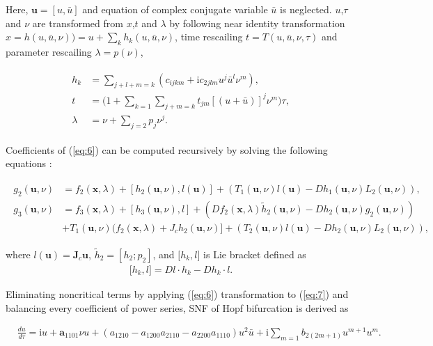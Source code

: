 \documentclass[openacc]{rsproca_new}%
\def\vec#1{\ensuremath{\mathbf{#1}}}
\newcommand{\Eref}[1]{(\ref{#1})}
\begin{document}
\noindent Here, \(\vec{u}=[u,\bar{u}]\) and equation of complex conjugate variable \(\bar{u}\) is neglected. \(u\),\(\tau\) and \(\nu\) are transformed from \(x\),\(t\) and \(\lambda\) by following near identity transformation
\(x=h(u,\bar{u},\nu))=u+\sum_k h_k(u,\bar{u},\nu)\), time rescailing \(t=T(u,\bar{u},\nu,\tau)\) and parameter rescailing \(\lambda=p(\nu)\),

\begin{align}\label{eq:6}
\begin{split}
h_k &=\sum_{j+l+m=k}(c_{ijkm}+\textrm{i}c_{2jlm}u^j\bar{u}^l \nu^m),\\
t &=\Big(1+\sum_{k=1}\sum_{j+m=k}t_{jm}[(u+\bar{u})]^j\nu^m\Big)\tau,\\
\lambda &=\nu+\sum_{j=2}p_j \nu^j.
\end{split}
\end{align}

\noindent Coefficients of \Eref{eq:6} can be computed recursively by solving the following equations \cite{yu2002simplest}:

\begin{align}\label{eq:7}
\begin{split}
g_2(\vec{u},\nu) &=f_2(\vec{x},\lambda)+[h_2(\vec{u},\nu),l(\vec{u})]+(T_1(\vec{u},\nu)l(\vec{u})-Dh_1(\vec{u},\nu) L_2(\vec{u},\nu)),\\
g_3(\vec{u},\nu) &=f_3(\vec{x},\lambda)+[h_3(\vec{u},\nu),l]+(Df_2(\vec{x},\lambda)\tilde h_2(\vec{u},\nu)-Dh_2(\vec{u},\nu)g_2(\vec{u},\nu))\\&+T_1(\vec{u},\nu)(f_2(\vec{x},\lambda)+J_ch_2(\vec{u},\nu)]+(T_2(\vec{u},\nu)l(\vec{u})-Dh_2(\vec{u},\nu)L_2(\vec{u},\nu)),
\end{split}
\end{align}

\noindent where \(l(\vec{u})=\vec{J}_c\vec{u}\), \(\tilde h_2=[h_2;p_2]\), and \(\big[h_k,l\big]\) is Lie bracket defined as
\begin{align}\label{eq:8}
\big[h_k,l\big]=Dl\cdot h_k-Dh_k\cdot l.
\end{align}

\noindent Eliminating noncritical terms by applying \Eref{eq:6} transformation to \Eref{eq:7} and balancing every coefficient of power series, SNF of Hopf bifurcation is derived as

\begin{align}\label{eq:9}
&\frac{du}{d\tau}=\textrm{i}u+\vec{a}_{1101}\nu u+(a_{1210}-a_{1200}a_{2110}-a_{2200}a_{1110})u^2\bar u+\textrm{i}\sum_{m=1}b_{2(2m+1)}u^{m+1}u^m.
\end{align}
\end{document}
